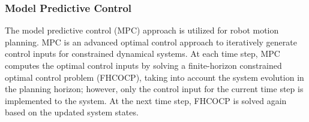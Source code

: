 \documentclass[journal]{IEEEtran}
\newcommand{\todonote}[1]{\vspace{0px} %
	\todo[inline, color=green!30]{\textbf{[Note:]} {#1}} %
}
\begin{document}
    \subsubsection{Model Predictive Control}
	The model predictive control (MPC) approach is utilized for robot motion planning. 
    MPC is an advanced optimal control approach to iteratively generate control inputs for constrained dynamical systems.
    At each time step, MPC computes the optimal control inputs by solving a finite-horizon constrained optimal control problem (FHCOCP), taking into account the system evolution in the planning horizon; 
however, only the control input for the current time step is implemented to the system. At the next time step, FHCOCP is solved again based on the updated system states.
    
\end{document}
